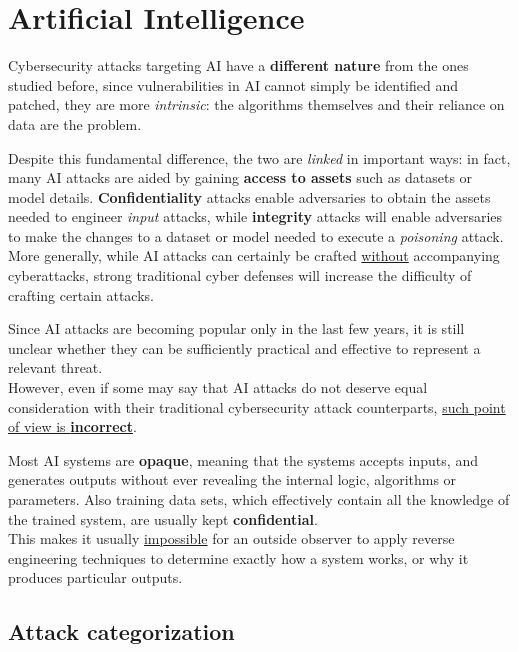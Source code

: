 \chapter{Artificial Intelligence}

Cybersecurity attacks targeting AI have a \textbf{different nature} from the ones studied before, since vulnerabilities in AI cannot simply be identified and patched, 
they are more \textit{intrinsic}:
the algorithms themselves and their reliance on data are the problem.

Despite this fundamental difference, the two are \textit{linked} in important ways:
in fact, many AI attacks are aided by gaining \textbf{access to assets} such as datasets or model details.
\textbf{Confidentiality} attacks  enable adversaries to obtain the assets needed to engineer \textit{input} attacks,
while \textbf{integrity} attacks will enable adversaries to make the changes to a dataset or model needed to execute a \textit{poisoning} attack.\\
More generally, while AI attacks can certainly be crafted \underline{without} accompanying cyberattacks,
strong traditional cyber defenses will increase the difficulty of crafting certain attacks.

\nl

Since AI attacks are becoming popular only in the last few years,
it is still unclear whether they can be sufficiently practical and effective to represent a relevant threat.\\
However, even if some may say that AI attacks do not deserve equal consideration with
their traditional cybersecurity attack counterparts, \underline{such point of view is \textbf{incorrect}}.

\nl

Most AI systems are \textbf{opaque}, meaning that the systems accepts inputs, and generates
outputs without ever revealing the internal logic, algorithms or parameters.
Also training data sets, which effectively contain all the knowledge of the
trained system, are usually kept \textbf{confidential}.\\
This makes it usually \underline{impossible} for an outside observer to apply reverse engineering techniques to determine exactly how a system works, or why it produces particular outputs.

\section{Attack categorization}
